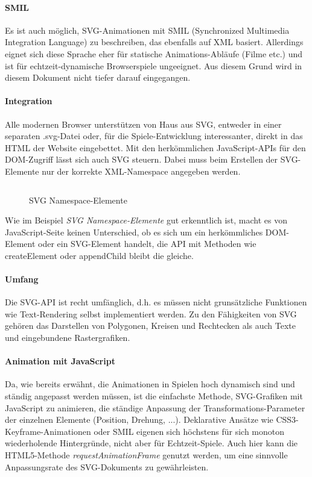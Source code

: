 \documentclass[a4paper, 12pt]{article}
\begin{document}
\paragraph{SMIL} Es ist auch möglich, SVG-Animationen mit SMIL (Synchronized Multimedia Integration Language) zu beschreiben, das ebenfalls auf XML basiert. Allerdings eignet sich diese Sprache eher für statische Animations-Abläufe (Filme etc.) und ist für echtzeit-dynamische Browserspiele ungeeignet. Aus diesem Grund wird in diesem Dokument nicht tiefer darauf eingegangen.
\paragraph{Integration} Alle modernen Browser unterstützen von Haus aus SVG, entweder in einer separaten .svg-Datei oder, für die Spiele-Entwicklung interessanter, direkt in das HTML der Website eingebettet. Mit den herkömmlichen JavaScript-APIs für den DOM-Zugriff lässt sich auch SVG steuern. Dabei muss beim Erstellen der SVG-Elemente nur der korrekte XML-Namespace angegeben werden.
\begin{figure}[h!]
	\inputminted{javascript}{assets/svg_example.js}
	\caption{SVG Namespace-Elemente}
	\label{svg_namespace_example}
\end{figure}
Wie im Beispiel \emph{SVG Namespace-Elemente} gut erkenntlich ist, macht es von JavaScript-Seite keinen Unterschied, ob es sich um ein herkömmliches DOM-Element oder ein SVG-Element handelt, die API mit Methoden wie createElement oder appendChild bleibt die gleiche.
\paragraph{Umfang} Die SVG-API ist recht umfänglich, d.h. es müssen nicht grunsätzliche Funktionen wie Text-Rendering selbst implementiert werden. Zu den Fähigkeiten von SVG gehören das Darstellen von Polygonen, Kreisen und Rechtecken als auch Texte und eingebundene Rastergrafiken.
\paragraph{Animation mit JavaScript} Da, wie bereits erwähnt, die Animationen in Spielen hoch dynamisch sind und ständig angepasst werden müssen, ist die einfachste Methode, SVG-Grafiken mit JavaScript zu animieren, die ständige Anpassung der Transformations-Parameter der einzelnen Elemente (Position, Drehung, ...). Deklarative Ansätze wie CSS3-Keyframe-Animationen oder SMIL eigenen sich höchstens für sich monoton wiederholende Hintergründe, nicht aber für Echtzeit-Spiele. Auch hier kann die HTML5-Methode \emph{requestAnimationFrame} genutzt werden, um eine sinnvolle Anpassungsrate des SVG-Dokuments zu gewährleisten.
\end{document}
